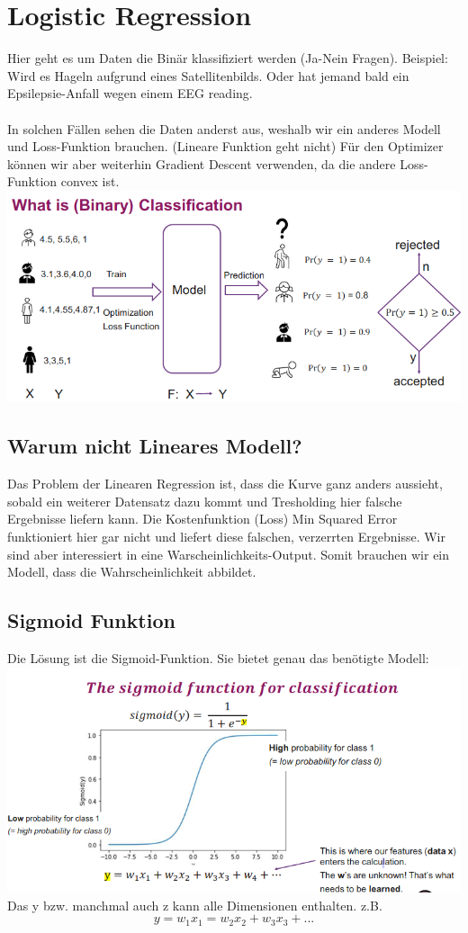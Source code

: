 \section{Logistic Regression}
Hier geht es um Daten die Binär klassifiziert werden (Ja-Nein Fragen). Beispiel: Wird es Hageln aufgrund eines Satellitenbilds. Oder hat jemand bald ein Epsilepsie-Anfall wegen einem EEG reading. \\
\\
In solchen Fällen sehen die Daten anderst aus, weshalb wir ein anderes Modell und Loss-Funktion brauchen. (Lineare Funktion geht nicht) Für den Optimizer können wir aber weiterhin Gradient Descent verwenden, da die andere Loss-Funktion convex ist.
\includegraphics[width=\linewidth]{img/binary_classification.png}
\subsection{Warum nicht Lineares Modell?}
Das Problem der Linearen Regression ist, dass die Kurve ganz anders aussieht, sobald ein weiterer Datensatz dazu kommt und Tresholding hier falsche Ergebnisse liefern kann. Die Kostenfunktion (Loss) Min Squared Error funktioniert hier gar nicht und liefert diese falschen, verzerrten Ergebnisse. Wir sind aber interessiert in eine Warscheinlichkeits-Output. Somit brauchen wir ein Modell, dass die Wahrscheinlichkeit abbildet.
\subsection{Sigmoid Funktion}
Die Lösung ist die Sigmoid-Funktion. Sie bietet genau das benötigte Modell:
\includegraphics[width=\linewidth]{img/sigmoid.png}
Das y bzw. manchmal auch z kann alle Dimensionen enthalten. z.B.
$$y = w_1x_1=w_2x_2+w_3x_3+...$$
